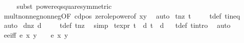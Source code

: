 \begin{isabellebody}
\ \ \ \ \isamarkupfalse%
{\isacharparenleft}subst\ power{}{\isacharunderscore}eq{\isacharunderscore}square{\isacharbrackleft}symmetric{\isacharbrackright}{\isacharparenright}\isanewline
\ \ \ \ \isamarkupfalse%
\ mult{\isacharunderscore}nonneg{\isacharunderscore}nonneg{\isacharbrackleft}OF\ c{\isacharunderscore}d{\isacharunderscore}pos\ zero{\isacharunderscore}le{\isacharunderscore}power{}{\isacharbrackleft}of\ {\isachardoublequoteopen}x{}{\isacharasterisk}y{}{\isachardoublequoteclose}{\isacharbrackright}{\isacharbrackright}\ \isamarkupfalse%
\ auto%
\endisatagproof
{\isafoldproof}%
%
\isadelimproof
\isanewline
%
\endisadelimproof
\isanewline
{}\isamarkupfalse%
\ t{\isacharunderscore}nz{\isacharcolon}\ {\isachardoublequoteopen}t\ {\isasymnoteq}\ {}{\isachardoublequoteclose}%
\isadelimproof
\ %
\endisadelimproof
%
\isatagproof
{}\isamarkupfalse%
\ t{\isacharunderscore}def\ t{\isacharunderscore}ineq{\isacharparenleft}{}{\isacharparenright}\ \isamarkupfalse%
\ auto%
\endisatagproof
{\isafoldproof}%
%
\isadelimproof
%
\endisadelimproof
\isanewline
\isanewline
{}\isamarkupfalse%
\ d{\isacharunderscore}nz{\isacharcolon}\ {\isachardoublequoteopen}d\ {\isasymnoteq}\ {}{\isachardoublequoteclose}%
\isadelimproof
\ %
\endisadelimproof
%
\isatagproof
{}\isamarkupfalse%
\ t{\isacharunderscore}def\ t{\isacharunderscore}nz\ \isamarkupfalse%
\ simp%
\endisatagproof
{\isafoldproof}%
%
\isadelimproof
%
\endisadelimproof
\isanewline
\isanewline
{}\isamarkupfalse%
\ t{\isacharunderscore}expr{\isacharcolon}\ {\isachardoublequoteopen}t{\isacharcircum}{}\ {\isacharequal}\ d{\isachardoublequoteclose}\ {\isachardoublequoteopen}t{\isacharcircum}{}\ {\isacharequal}\ d{\isacharcircum}{}{\isachardoublequoteclose}%
\isadelimproof
\ %
\endisadelimproof
%
\isatagproof
{}\isamarkupfalse%
\ t{\isacharunderscore}def\ t{\isacharunderscore}intro\ \isamarkupfalse%
\ auto%
\endisatagproof
{\isafoldproof}%
%
\isadelimproof
%
\endisadelimproof
\isanewline
\isanewline
{}\isamarkupfalse%
\ e{\isacharunderscore}e{\isacharprime}{\isacharunderscore}iff{\isacharcolon}\ {\isachardoublequoteopen}e\ x\ y\ {\isacharequal}\ {}\ {\isasymlongleftrightarrow}\ e{\isacharprime}\ x\ y\ {\isacharequal}\ {}{\isachardoublequoteclose}\isanewline
%
\isadelimproof
\ \ %
\endisadelimproof

\end{isabellebody}
